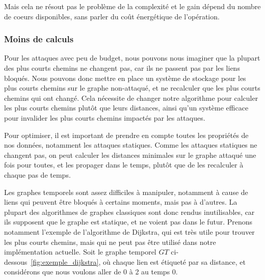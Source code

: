 \bigskip
Mais cela ne résout pas le problème de la complexité et le gain dépend du nombre de coeurs disponibles, sans parler du coût énergétique de l'opération.

\subsubsection{Moins de calculs}\label{subsubsec:moins_de_calculs}

\label{subsubsubsec:cache}
Pour les attaques avec peu de budget, nous pouvons nous imaginer que la plupart des plus courts chemins ne changent pas, car ils ne passent pas par les liens bloqués.
Nous pouvons donc mettre en place un système de stockage pour les plus courts chemins sur le graphe non-attaqué, et ne recalculer que les plus courts chemins qui ont changé.
Cela nécessite de changer notre algorithme pour calculer les plus courts chemins plutôt que leurs distances, ainsi qu'un système efficace pour invalider les plus courts chemins impactés par les attaques.

\label{subsubsubsec:proprietes_attaques_statiques}
Pour optimiser, il est important de prendre en compte toutes les propriétés de nos données, notamment les attaques statiques.
Comme les attaques statiques ne changent pas, on peut calculer les distances minimales sur le graphe attaqué une fois pour toutes, et les propager dans le temps, plutôt que de les recalculer à chaque pas de temps.

\label{subsubsubsec:structure_de_donnees_opti}
Les graphes temporels sont assez difficiles à manipuler, notamment à cause de liens qui peuvent être bloqués à certains moments, mais pas à d'autres.
La plupart des algorithmes de graphes classiques sont donc rendus inutilisables, car ils supposent que le graphe est statique, et ne voient pas dans le futur.
Prenons notamment l'exemple de l'algorithme de Dijkstra, qui est très utile pour trouver les plus courts chemins, mais qui ne peut pas être utilisé dans notre implémentation actuelle.
Soit le graphe temporel $GT$ ci-dessous~\ref{fig:exemple_dijkstra}, où chaque lien est étiqueté par sa distance, et considérons que nous voulons aller de 0 à 2 au temps 0.

